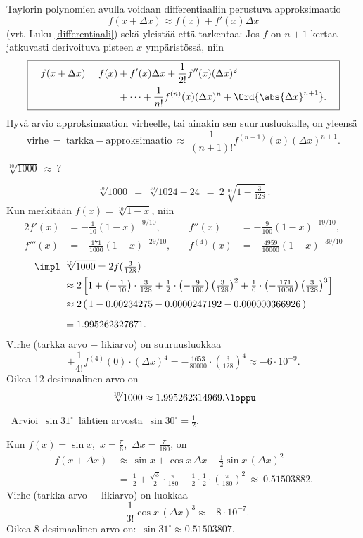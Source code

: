 Taylorin polynomien avulla voidaan differentiaaliin perustuva approksimaatio
\[
f(x+\Delta x)\approx f(x)+f'(x)\Delta x
\]
(vrt. Luku \ref{differentiaali}) sekä yleistää että tarkentaa: Jos $f$ on $n+1$ kertaa 
jatkuvasti derivoituva pisteen $x$ ympäristössä, niin
\[
\boxed{\begin{aligned}
\quad f(x+\Delta x)=f(x)
         &+f'(x)\Delta x+\frac{1}{2!}f''(x)(\Delta x)^2 \\
         &+ \cdots + \frac{1}{n!}f^{(n)}(x)(\Delta x)^n+\Ord{\abs{\Delta x}^{n+1}}. \quad
\end{aligned}}
\]
Hyvä arvio approksimaation virheelle, tai ainakin sen suuruusluokalle, on yleensä
\[
\text{virhe}\ =\ \text{tarkka}-\text{approksimaatio}\ 
                     \approx\ \frac{1}{(n+1)!}f^{(n+1)}(x)(\Delta x)^{n+1}.
\]
\begin{Exa} $\sqrt[10]{1000}\ \approx\ ?$ \end{Exa}
\ratk
\[
\sqrt[10]{1000}\ =\ \sqrt[10]{1024-24}\ =\ 2\sqrt[10]{1-\tfrac{3}{128}}\,.
\]
Kun merkitään $f(x)=\sqrt[10]{1-x}$, niin
\begin{alignat*}{2}
f'(x)&=-\tfrac{1}{10}(1-x)^{-9/10},\quad &f''(x)&=-\tfrac{9}{100}(1-x)^{-19/10}, \\
f'''(x)&=-\tfrac{171}{1000}(1-x)^{-29/10},\quad &f^{(4)}(x)&=-\tfrac{4959}{10000}(1-x)^{-39/10}
\end{alignat*}
\begin{align*}
\impl \ &\sqrt[10]{1000} =2f(\tfrac{3}{128}) \\
&\approx 2\left[1+\left(-\tfrac{1}{10}\right)\cdot\tfrac{3}{128}
                 +\tfrac{1}{2}\cdot\left(-\tfrac{9}{100}\right)\left(\tfrac{3}{128}\right)^2 +
       \tfrac{1}{6}\cdot\left(-\tfrac{171}{1000}\right)\left(\tfrac{3}{128}\right)^3\right] \\
&\approx 2\,(\,1-0.00234275-0.0000247192-0.000000366926\,) \\[2mm]
&= 1.995262327671.
\end{align*}
Virhe (tarkka arvo $-$ likiarvo) on suuruusluokkaa
\[
+\frac{1}{4!}f^{(4)}(0)\cdot (\Delta x)^4 
             = -\tfrac{1653}{80000}\cdot\left(\tfrac{3}{128}\right)^4\approx -6\cdot 10^{-9}.
\]
Oikea 12-desimaalinen arvo on
\[
\sqrt[10]{1000}\approx 1.995262314969. \loppu
\]

\begin{Exa}\ Arvioi $\,\sin 31^\circ\,$ lähtien arvosta $\,\sin 30^\circ = \tfrac{1}{2}$.
\end{Exa}
\ratk Kun $f(x)=\sin x$,\ $x=\tfrac{\pi}{6}$,\ $\Delta x=\tfrac{\pi}{180}$, on
\begin{align*}
f(x+\Delta x) \,&\approx\, \sin x + \cos x\,\Delta x-\tfrac{1}{2}\sin x\,(\Delta x)^2 \\
              \,&=\, \tfrac{1}{2}+\tfrac{\sqrt{3}}{2}\cdot\tfrac{\pi}{180}
                  -\tfrac{1}{2}\cdot\tfrac{1}{2}\cdot\left(\tfrac{\pi}{180}\right)^2\ 
                 \approx\ 0.51503882.
\end{align*}
Virhe (tarkka arvo $-$ likiarvo) on luokkaa
\[
-\frac{1}{3!}\cos x\,(\Delta x)^3\approx -8\cdot 10^{-7}.
\]
Oikea 8-desimaalinen arvo on: $\,\sin 31^\circ\approx 0.51503807$. \loppu


